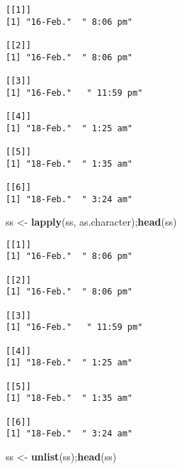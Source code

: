 \documentclass[10,portrait]{article}
\newenvironment{Shaded}{\begin{snugshade}}{\end{snugshade}}
\newcommand{\KeywordTok}[1]{\textcolor[rgb]{0.13,0.29,0.53}{\textbf{#1}}}
\newcommand{\StringTok}[1]{\textcolor[rgb]{0.31,0.60,0.02}{#1}}
\newcommand{\CommentTok}[1]{\textcolor[rgb]{0.56,0.35,0.01}{\textit{#1}}}
\newcommand{\OperatorTok}[1]{\textcolor[rgb]{0.81,0.36,0.00}{\textbf{#1}}}
\newcommand{\NormalTok}[1]{#1}
\begin{document}
\begin{Shaded}
\end{Shaded}

\begin{verbatim}
[[1]]
[1] "16-Feb."  " 8:06 pm"

[[2]]
[1] "16-Feb."  " 8:06 pm"

[[3]]
[1] "16-Feb."   " 11:59 pm"

[[4]]
[1] "18-Feb."  " 1:25 am"

[[5]]
[1] "18-Feb."  " 1:35 am"

[[6]]
[1] "18-Feb."  " 3:24 am"
\end{verbatim}

\begin{Shaded}
\begin{Highlighting}[]
\NormalTok{ss <-}\StringTok{ }\KeywordTok{lapply}\NormalTok{(ss, as.character);}\KeywordTok{head}\NormalTok{(ss)}
\end{Highlighting}
\end{Shaded}

\begin{verbatim}
[[1]]
[1] "16-Feb."  " 8:06 pm"

[[2]]
[1] "16-Feb."  " 8:06 pm"

[[3]]
[1] "16-Feb."   " 11:59 pm"

[[4]]
[1] "18-Feb."  " 1:25 am"

[[5]]
[1] "18-Feb."  " 1:35 am"

[[6]]
[1] "18-Feb."  " 3:24 am"
\end{verbatim}

\begin{Shaded}
\begin{Highlighting}[]
\NormalTok{ss <-}\StringTok{ }\KeywordTok{unlist}\NormalTok{(ss);}\KeywordTok{head}\NormalTok{(ss)}
\end{Highlighting}
\end{Shaded}
\end{document}
